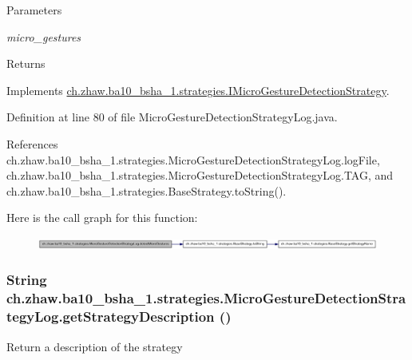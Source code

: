 \begin{DoxyParams}{Parameters}
\item[{\em micro\_\-gestures}]\end{DoxyParams}
\begin{DoxyReturn}{Returns}

\end{DoxyReturn}


Implements \hyperlink{interfacech_1_1zhaw_1_1ba10__bsha__1_1_1strategies_1_1IMicroGestureDetectionStrategy_a8593331fb67e5d4dc890d3db9f2d1b58}{ch.zhaw.ba10\_\-bsha\_\-1.strategies.IMicroGestureDetectionStrategy}.

Definition at line 80 of file MicroGestureDetectionStrategyLog.java.

References ch.zhaw.ba10\_\-bsha\_\-1.strategies.MicroGestureDetectionStrategyLog.logFile, ch.zhaw.ba10\_\-bsha\_\-1.strategies.MicroGestureDetectionStrategyLog.TAG, and ch.zhaw.ba10\_\-bsha\_\-1.strategies.BaseStrategy.toString().

Here is the call graph for this function:\nopagebreak
\begin{figure}[H]
\begin{center}
\leavevmode
\includegraphics[width=420pt]{classch_1_1zhaw_1_1ba10__bsha__1_1_1strategies_1_1MicroGestureDetectionStrategyLog_a52165ea7fe9595afa64e85b511c3ddbd_cgraph}
\end{center}
\end{figure}
\hypertarget{classch_1_1zhaw_1_1ba10__bsha__1_1_1strategies_1_1MicroGestureDetectionStrategyLog_a9acf1884421d95bf09bfea17a9c11b07}{
\subsubsection[{getStrategyDescription}]{\setlength{\rightskip}{0pt plus 5cm}String ch.zhaw.ba10\_\-bsha\_\-1.strategies.MicroGestureDetectionStrategyLog.getStrategyDescription ()}}
\label{classch_1_1zhaw_1_1ba10__bsha__1_1_1strategies_1_1MicroGestureDetectionStrategyLog_a9acf1884421d95bf09bfea17a9c11b07}
Return a description of the strategy

